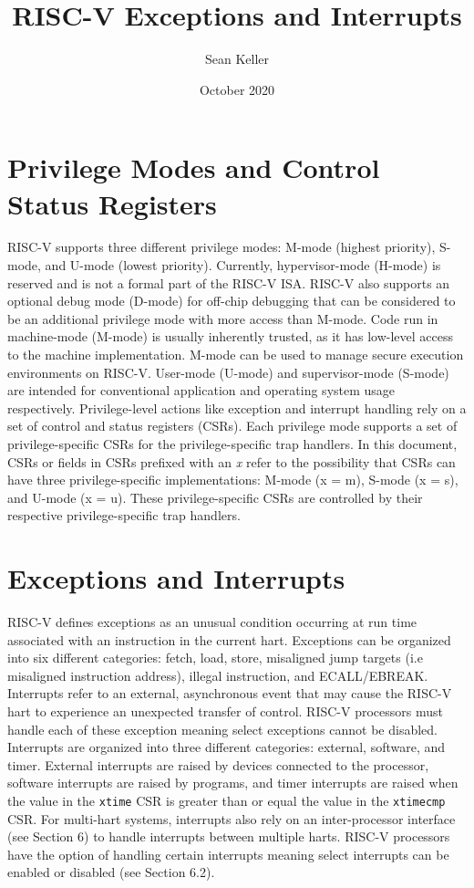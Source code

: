 \documentclass[12pt]{article}
\title{RISC-V Exceptions and Interrupts}
\author{Sean Keller}
\date{October 2020}
\begin{document}
\maketitle
\newpage

\section{Privilege Modes and Control Status Registers}
RISC-V supports three different privilege modes: M-mode (highest priority), S-mode, and U-mode (lowest priority). Currently, hypervisor-mode (H-mode) is reserved and is not a formal part of the RISC-V ISA. RISC-V also supports an optional debug mode (D-mode) for off-chip debugging that can be considered to be an additional privilege mode with more access than M-mode. Code run in machine-mode (M-mode) is usually inherently trusted, as it has low-level access to the machine implementation. M-mode can be used to manage secure execution environments on RISC-V. User-mode (U-mode) and supervisor-mode (S-mode) are intended for conventional application and operating system usage respectively. Privilege-level actions like exception and interrupt handling rely on a set of control and status registers (CSRs). Each privilege mode supports a set of privilege-specific CSRs for the privilege-specific trap handlers. In this document, CSRs or fields in CSRs prefixed with an \emph{x} refer to the possibility that CSRs can have three privilege-specific implementations: M-mode (x = m), S-mode (x = s), and U-mode (x = u). These privilege-specific CSRs are controlled by their respective privilege-specific trap handlers.

\section{Exceptions and Interrupts}
RISC-V defines exceptions as an unusual condition occurring at run time associated with an instruction in the current hart. Exceptions can be organized into six different categories: fetch, load, store, misaligned jump targets (i.e misaligned instruction address), illegal instruction, and ECALL/EBREAK. Interrupts refer to an external, asynchronous event that may cause the RISC-V hart to experience an unexpected transfer of control. RISC-V processors must handle each of these exception meaning select exceptions cannot be disabled. Interrupts are organized into three different categories: external, software, and timer. External interrupts are raised by devices connected to the processor, software interrupts are raised by programs, and timer interrupts are raised when the value in the {\tt{xtime}} CSR is greater than or equal the value in the {\tt{xtimecmp}} CSR. For multi-hart systems, interrupts also rely on an inter-processor interface (see Section 6) to handle interrupts between multiple harts. RISC-V processors have the option of handling certain interrupts meaning select interrupts can be enabled or disabled (see Section 6.2). 
\end{document}
